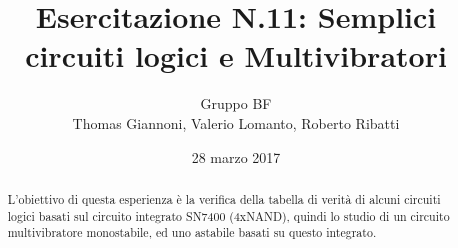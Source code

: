 \documentclass[a4paper,11pt]{article}
\author{Gruppo BF \\ Thomas Giannoni, Valerio Lomanto, Roberto Ribatti}
\title{Esercitazione N.11: Semplici circuiti logici e Multivibratori}
\date{28 marzo 2017}
\begin{document}
\maketitle
\begin{abstract}
	L'obiettivo di questa esperienza è la verifica della tabella di verità di alcuni circuiti logici basati sul circuito integrato SN7400 (4xNAND), quindi lo studio di un circuito multivibratore monostabile, ed uno astabile basati su questo integrato.
\end{abstract}




\end{document}
